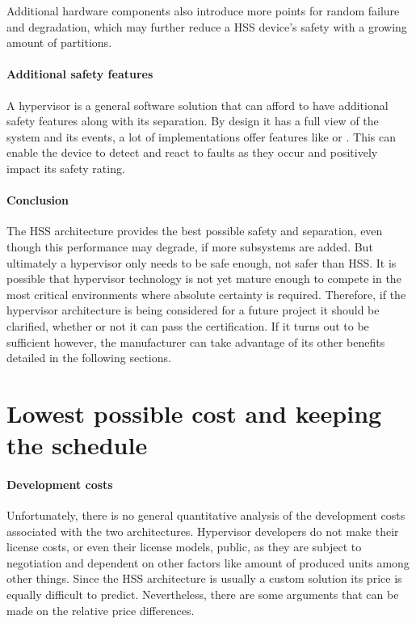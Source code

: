 Additional hardware components also introduce more points for random failure and degradation, which may further reduce a \gls{HSS} device's safety with a growing amount of partitions.

\paragraph{Additional safety features}
A hypervisor is a general software solution that can afford to have additional safety features along with its separation. By design it has a full view of the system and its events, a lot of implementations offer features like  or . This can enable the device to detect and react to faults as they occur and positively impact its safety rating.

\paragraph{Conclusion}
The \gls{HSS} architecture provides the best possible safety and separation, even though this performance may degrade, if more subsystems are added. But ultimately a hypervisor only needs to be safe enough, not safer than \gls{HSS}. It is possible that hypervisor technology is not yet mature enough to compete in the most critical environments where absolute certainty is required. Therefore, if the hypervisor architecture is being considered for a future project it should be clarified, whether or not it can pass the certification. If it turns out to be sufficient however, the manufacturer can take advantage of its other benefits detailed in the following sections.



\section{Lowest possible cost and keeping the schedule}
\paragraph{Development costs}
Unfortunately, there is no general quantitative analysis of the development costs associated with the two architectures. Hypervisor developers do not make their license costs, or even their license models, public, as they are subject to negotiation and dependent on other factors like amount of produced units among other things. Since the \gls{HSS} architecture is usually a custom solution its price is equally difficult to predict. Nevertheless, there are some arguments that can be made on the relative price differences. 

